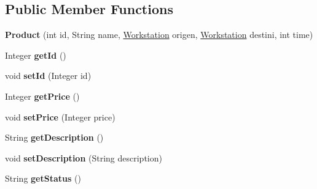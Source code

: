 \subsection*{Public Member Functions}
\begin{DoxyCompactItemize}
\item 
\mbox{\label{classmondragon_1_1edu_1_1clases_1_1_product_aead3bed7e7b6423912d24d9ef1f219b1}} 
{\bfseries Product} (int id, String name, \mbox{\hyperlink{classmondragon_1_1edu_1_1clases_1_1_workstation}{Workstation}} origen, \mbox{\hyperlink{classmondragon_1_1edu_1_1clases_1_1_workstation}{Workstation}} destini, int time)
\item 
\mbox{\label{classmondragon_1_1edu_1_1clases_1_1_product_ac436c405351b8d701af18ad79fecd05a}} 
Integer {\bfseries get\+Id} ()
\item 
\mbox{\label{classmondragon_1_1edu_1_1clases_1_1_product_a4c44b86ee5b9d566b5e6bda727ee5184}} 
void {\bfseries set\+Id} (Integer id)
\item 
\mbox{\label{classmondragon_1_1edu_1_1clases_1_1_product_ad994f0ac807901184dd6b768d8c82821}} 
Integer {\bfseries get\+Price} ()
\item 
\mbox{\label{classmondragon_1_1edu_1_1clases_1_1_product_a46b032497f4c4905e5a679ccc4bcaa90}} 
void {\bfseries set\+Price} (Integer price)
\item 
\mbox{\label{classmondragon_1_1edu_1_1clases_1_1_product_ab2c3d451ab35eaf7c9ffdafc597eac5d}} 
String {\bfseries get\+Description} ()
\item 
\mbox{\label{classmondragon_1_1edu_1_1clases_1_1_product_a025ca0f22e1de3274412e0e8168e7530}} 
void {\bfseries set\+Description} (String description)
\item 
\mbox{\label{classmondragon_1_1edu_1_1clases_1_1_product_a2c8cf433e2c363ecb5493a90c36095a5}} 
String {\bfseries get\+Status} ()

\end{DoxyCompactItemize}
